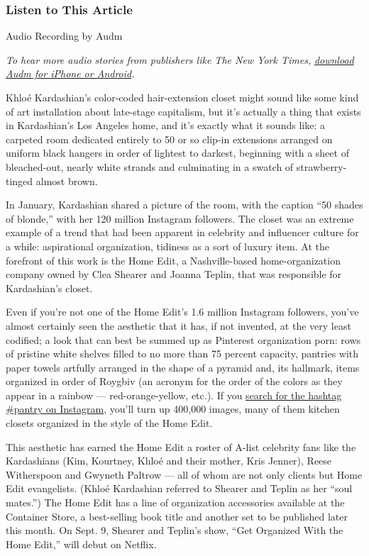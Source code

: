 \hypertarget{listen-to-this-article}{%
\subsubsection{Listen to This Article}\label{listen-to-this-article}}

Audio Recording by Audm

\emph{To hear more audio stories from publishers like The New York
Times,}
\href{https://www.audm.com/?utm_source=nytmag\&utm_medium=embed\&utm_campaign=instagram_sock_drawer_fitzsimons}{\emph{download
Audm for iPhone or Android}}\emph{.}

Khloé Kardashian's color-coded hair-extension closet might sound like
some kind of art installation about late-stage capitalism, but it's
actually a thing that exists in Kardashian's Los Angeles home, and it's
exactly what it sounds like: a carpeted room dedicated entirely to 50 or
so clip-in extensions arranged on uniform black hangers in order of
lightest to darkest, beginning with a sheet of bleached-out, nearly
white strands and culminating in a swatch of strawberry-tinged almost
brown.

In January, Kardashian shared a picture of the room, with the caption
``50 shades of blonde,'' with her 120 million Instagram followers. The
closet was an extreme example of a trend that had been apparent in
celebrity and influencer culture for a while: aspirational organization,
tidiness as a sort of luxury item. At the forefront of this work is the
Home Edit, a Nashville-based home-organization company owned by Clea
Shearer and Joanna Teplin, that was responsible for Kardashian's closet.

Even if you're not one of the Home Edit's 1.6 million Instagram
followers, you've almost certainly seen the aesthetic that it has, if
not invented, at the very least codified; a look that can best be summed
up as Pinterest organization porn: rows of pristine white shelves filled
to no more than 75 percent capacity, pantries with paper towels artfully
arranged in the shape of a pyramid and, its hallmark, items organized in
order of Roygbiv (an acronym for the order of the colors as they appear
in a rainbow --- red-orange-yellow, etc.). If you
\href{https://www.instagram.com/explore/tags/pantry/?hl=en}{search for
the hashtag \#pantry on Instagram}, you'll turn up 400,000 images, many
of them kitchen closets organized in the style of the Home Edit.

This aesthetic has earned the Home Edit a roster of A-list celebrity
fans like the Kardashians (Kim, Kourtney, Khloé and their mother, Kris
Jenner), Reese Witherspoon and Gwyneth Paltrow --- all of whom are not
only clients but Home Edit evangelists. (Khloé Kardashian referred to
Shearer and Teplin as her ``soul mates.'') The Home Edit has a line of
organization accessories available at the Container Store, a
best-selling book title and another set to be published later this
month. On Sept. 9, Shearer and Teplin's show, ``Get Organized With the
Home Edit,'' will debut on Netflix.

